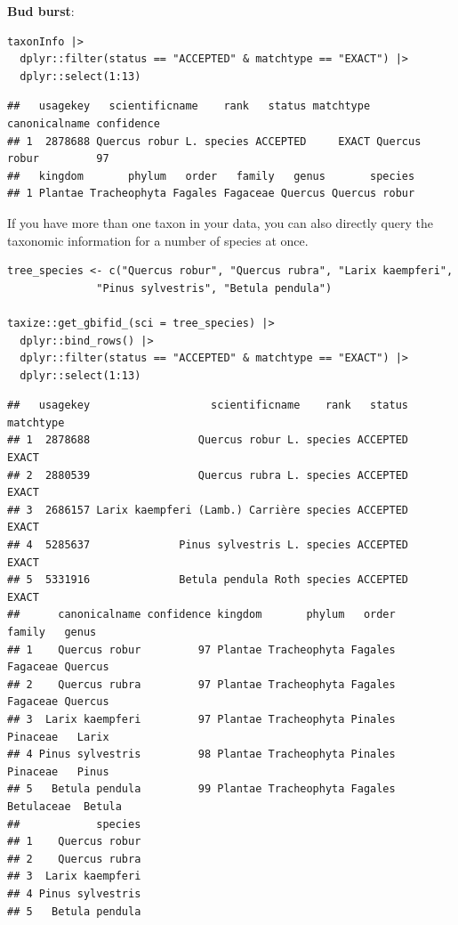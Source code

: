 \documentclass[
  oneside]{book}
\begin{document}
\begin{examplebox}

\textbf{Bud burst}:

\begin{verbatim}
taxonInfo |> 
  dplyr::filter(status == "ACCEPTED" & matchtype == "EXACT") |> 
  dplyr::select(1:13)
\end{verbatim}

\begin{verbatim}
##   usagekey   scientificname    rank   status matchtype canonicalname confidence
## 1  2878688 Quercus robur L. species ACCEPTED     EXACT Quercus robur         97
##   kingdom       phylum   order   family   genus       species
## 1 Plantae Tracheophyta Fagales Fagaceae Quercus Quercus robur
\end{verbatim}

If you have more than one taxon in your data, you can also directly query the taxonomic information for a number of species at once.

\begin{verbatim}
tree_species <- c("Quercus robur", "Quercus rubra", "Larix kaempferi", 
              "Pinus sylvestris", "Betula pendula")

taxize::get_gbifid_(sci = tree_species) |>
  dplyr::bind_rows() |>
  dplyr::filter(status == "ACCEPTED" & matchtype == "EXACT") |> 
  dplyr::select(1:13)
\end{verbatim}

\begin{verbatim}
##   usagekey                   scientificname    rank   status matchtype
## 1  2878688                 Quercus robur L. species ACCEPTED     EXACT
## 2  2880539                 Quercus rubra L. species ACCEPTED     EXACT
## 3  2686157 Larix kaempferi (Lamb.) Carrière species ACCEPTED     EXACT
## 4  5285637              Pinus sylvestris L. species ACCEPTED     EXACT
## 5  5331916              Betula pendula Roth species ACCEPTED     EXACT
##      canonicalname confidence kingdom       phylum   order     family   genus
## 1    Quercus robur         97 Plantae Tracheophyta Fagales   Fagaceae Quercus
## 2    Quercus rubra         97 Plantae Tracheophyta Fagales   Fagaceae Quercus
## 3  Larix kaempferi         97 Plantae Tracheophyta Pinales   Pinaceae   Larix
## 4 Pinus sylvestris         98 Plantae Tracheophyta Pinales   Pinaceae   Pinus
## 5   Betula pendula         99 Plantae Tracheophyta Fagales Betulaceae  Betula
##            species
## 1    Quercus robur
## 2    Quercus rubra
## 3  Larix kaempferi
## 4 Pinus sylvestris
## 5   Betula pendula
\end{verbatim}

\end{examplebox}
\end{document}
